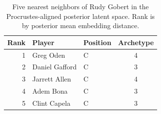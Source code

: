 \begin{table}[htbp]
  \centering\small
  \begin{tabular}{rllc}
    \toprule
    Rank & Player & Position & Archetype \\
    \midrule
    1 & Greg Oden & C & 4 \\
    2 & Daniel Gafford & C & 3 \\
    3 & Jarrett Allen & C & 4 \\
    4 & Adem Bona & C & 3 \\
    5 & Clint Capela & C & 3 \\
    \bottomrule
  \end{tabular}
  \caption{Five nearest neighbors of Rudy Gobert in the Procrustes-aligned posterior latent space. Rank is by posterior mean embedding distance.}
  \label{tab:Rudy_Gobert_neighbors}
\end{table}

